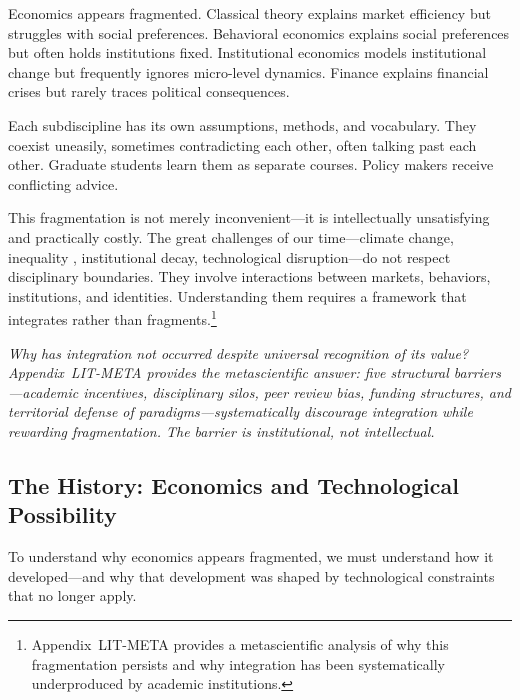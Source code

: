 Economics appears fragmented. Classical theory explains market efficiency but struggles with social preferences. Behavioral economics explains social preferences but often holds institutions fixed. Institutional economics models institutional change but frequently ignores micro-level dynamics. Finance explains financial crises but rarely traces political consequences.

Each subdiscipline has its own assumptions, methods, and vocabulary. They coexist uneasily, sometimes contradicting each other, often talking past each other. Graduate students learn them as separate courses. Policy makers receive conflicting advice.

This fragmentation is not merely inconvenient---it is intellectually unsatisfying and practically costly. The great challenges of our time---climate change, inequality \citep{piketty2014}, institutional decay, technological disruption---do not respect disciplinary boundaries. They involve interactions between markets, behaviors, institutions, and identities. Understanding them requires a framework that integrates rather than fragments.\footnote{Appendix~LIT-META provides a metascientific analysis of why this fragmentation persists and why integration has been systematically underproduced by academic institutions.}

\textit{Why has integration not occurred despite universal recognition of its value?
Appendix~LIT-META provides the metascientific answer: five structural barriers---academic
incentives, disciplinary silos, peer review bias, funding structures, and territorial
defense of paradigms---systematically discourage integration while rewarding fragmentation.
The barrier is institutional, not intellectual.}

\subsection{The History: Economics and Technological Possibility}
\label{sec:intro-history}

To understand why economics appears fragmented, we must understand how it developed---and why that development was shaped by technological constraints that no longer apply.

